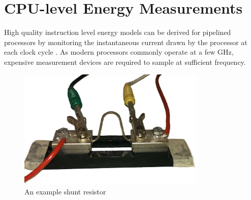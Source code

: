 \section{CPU-level Energy Measurements}

High quality instruction level energy models can be derived for pipelined
processors by monitoring the instantaneous current drawn by the processor at
each clock cycle \cite{nikolaidis2005instruction}. As modern processors commonly
operate at a few GHz, expensive measurement devices are required to sample
at sufficient frequency.



\begin{figure}
    \centering
    \includegraphics[width=0.8\textwidth]{figs/shunt.jpg}
    \caption{An example shunt resistor}
    \label{fig:shunt}
\end{figure}


